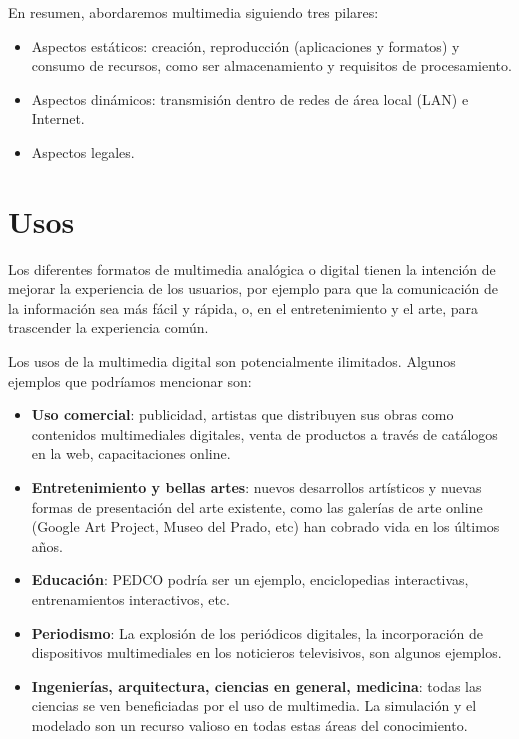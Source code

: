 \documentclass[12pt]{article}
\begin{document}
En resumen, abordaremos multimedia siguiendo tres pilares:
\begin{itemize}
\item Aspectos estáticos: creación, reproducción (aplicaciones y formatos) y 
consumo de recursos, como ser almacenamiento y requisitos de procesamiento. 
\item Aspectos dinámicos: transmisión dentro de redes de área local (LAN) e 
Internet. 
\item Aspectos legales.  
\end{itemize}

\section*{Usos}

Los diferentes formatos de multimedia analógica o digital tienen la 
intención de mejorar la experiencia de los usuarios, por ejemplo para 
que la comunicación de la información sea más fácil y rápida, o, en 
el entretenimiento y el arte, para trascender la experiencia común.\cite{wikipmmes} 

Los usos de la multimedia digital son potencialmente ilimitados. Algunos 
ejemplos que podríamos mencionar son:  

\begin{itemize}
\item {\bf Uso comercial}: publicidad, artistas que distribuyen sus obras como contenidos 
multimediales digitales, venta de productos a través de catálogos en la web, capacitaciones online. 
\item {\bf Entretenimiento y bellas artes}: nuevos desarrollos artísticos y nuevas formas 
de presentación del arte existente, como las galerías de arte online (Google Art Project, 
Museo del Prado, etc) han cobrado vida en los últimos años.  
\item {\bf Educación}: PEDCO podría ser un ejemplo, enciclopedias interactivas, entrenamientos
interactivos, etc. 
\item {\bf Periodismo}: La explosión de los periódicos digitales, la incorporación de dispositivos 
multimediales en los noticieros televisivos, son algunos ejemplos. 
\item {\bf Ingenierías, arquitectura, ciencias en general, medicina}: todas las ciencias se ven 
beneficiadas por el uso de multimedia. La simulación y el modelado son un recurso 
valioso en todas estas áreas del conocimiento. 
\end{itemize}
\end{document}
